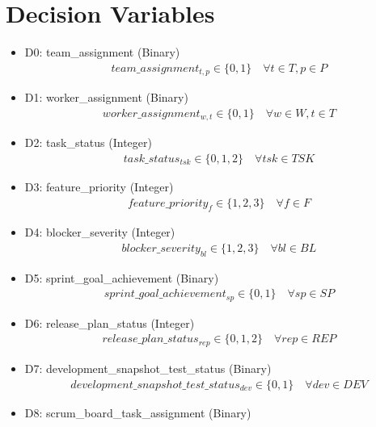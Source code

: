 \documentclass{article}
\begin{document}
\section{Decision Variables}
\begin{itemize}
    \item D0: team\_assignment (Binary)
        \begin{align*}
            team\_assignment_{t, p} \in \{0, 1\} \quad \forall t \in T, p \in P
        \end{align*}
    \item D1: worker\_assignment (Binary)
        \begin{align*}
            worker\_assignment_{w, t} \in \{0, 1\} \quad \forall w \in W, t \in T
        \end{align*}
    \item D2: task\_status (Integer)
        \begin{align*}
            task\_status_{tsk} \in \{0, 1, 2\} \quad \forall tsk \in TSK
        \end{align*}
    \item D3: feature\_priority (Integer)
        \begin{align*}
            feature\_priority_{f} \in \{1, 2, 3\} \quad \forall f \in F
        \end{align*}
    \item D4: blocker\_severity (Integer)
        \begin{align*}
            blocker\_severity_{bl} \in \{1, 2, 3\} \quad \forall bl \in BL
        \end{align*}
    \item D5: sprint\_goal\_achievement (Binary)
        \begin{align*}
            sprint\_goal\_achievement_{sp} \in \{0, 1\} \quad \forall sp \in SP
        \end{align*}
    \item D6: release\_plan\_status (Integer)
        \begin{align*}
            release\_plan\_status_{rep} \in \{0, 1, 2\} \quad \forall rep \in REP
        \end{align*}
    \item D7: development\_snapshot\_test\_status (Binary)
        \begin{align*}
            development\_snapshot\_test\_status_{dev} \in \{0, 1\} \quad \forall dev \in DEV
        \end{align*}
    \item D8: scrum\_board\_task\_assignment (Binary)

\end{itemize}
\end{document}

